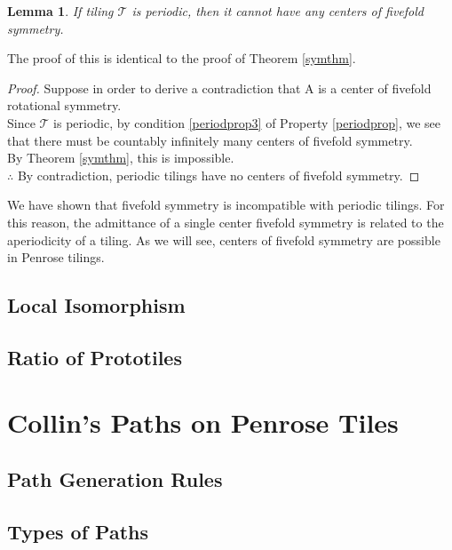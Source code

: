 \documentclass[]{article}
\newtheorem{mylem}{Lemma}
\begin{document}
\begin{mylem}
If tiling $\mathcal{T}$ is periodic, then it cannot have any centers of fivefold symmetry.
\end{mylem}
The proof of this is identical to the proof of Theorem \ref{symthm}.
\begin{proof}
Suppose in order to derive a contradiction that A is a center of fivefold rotational symmetry.\\
Since $\mathcal{T}$ is periodic, by condition \ref{periodprop3} of Property \ref{periodprop}, we see that there must be countably infinitely many centers of fivefold symmetry.\\
By Theorem \ref{symthm}, this is impossible.\\
$\therefore$ By contradiction, periodic tilings have no centers of fivefold symmetry.
\end{proof}

We have shown that fivefold symmetry is incompatible with periodic tilings. For this reason, the admittance of a single center fivefold symmetry is related to the aperiodicity of a tiling. As we will see, centers of fivefold symmetry are possible in Penrose tilings. 

\subsection{Local Isomorphism}
\subsection{Ratio of Prototiles}


\section{Collin's Paths on Penrose Tiles}
\subsection{Path Generation Rules}
\subsection{Types of Paths}






\nocite{Penrose1979,Ogawa1999,Kepler1997,DeBruijn1990,DeBruijn1989,DeBruijn1981,Conway1986}


\end{document}
